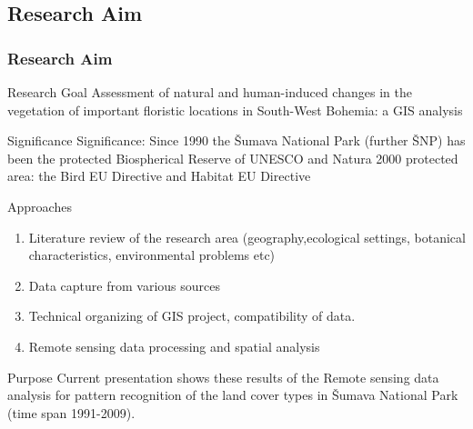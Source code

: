 \documentclass[pdflatex,compress,8pt,
	xcolor={dvipsnames,dvipsnames,svgnames,x11names,table},
	hyperref={
	breaklinks = true, 
	pdfauthor={Lemenkova Polina}, 
	pdfsubject={Preentation}, 
	pdfcreator={Lemenkova Polina}, 
	pdfproducer={Lemenkova Polina}, 
	colorlinks=true,linkcolor=blue, 
	citecolor=NavyBlue, 
	urlcolor = NavyBlue, 
	breaklinks = true}]{beamer}
\begin{document}
\subsection{Research Aim}
\begin{frame}\frametitle{Research Aim}

\begin{alertblock}{Research Goal}
Assessment of natural and human-induced changes in the vegetation of important floristic locations in South-West Bohemia: a GIS analysis
\end{alertblock}

\begin{alertblock}{Significance}
Significance: Since 1990 the Šumava National Park (further ŠNP) has been the protected Biospherical Reserve of UNESCO and Natura 2000 protected area: the Bird EU Directive and Habitat EU Directive
\end{alertblock}

\begin{block}{Approaches}
\begin{enumerate}
	\item Literature review of the research area (geography,ecological settings, botanical characteristics, environmental problems etc)
	\item Data capture from various sources
	\item Technical organizing of GIS project, compatibility of data.
	\item Remote sensing data processing and spatial analysis
\end{enumerate}
\end{block}

\begin{examples}{Purpose}
Current presentation shows these results of the Remote sensing data analysis for pattern recognition of the land cover types in Šumava National Park (time span 1991-2009).
\end{examples}

\end{frame}
\end{document}
